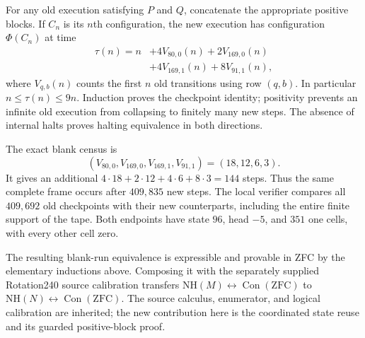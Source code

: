 For any old execution satisfying $P$ and $Q$, concatenate the
appropriate positive blocks.  If $C_n$ is its $n$th configuration,
the new execution has configuration $\Phi(C_n)$ at time
\begin{align*}
\tau(n)=n
 &+4V_{80,0}(n)+2V_{169,0}(n)\\
 &+4V_{169,1}(n)+8V_{91,1}(n),
\end{align*}
where $V_{q,b}(n)$ counts the first $n$ old transitions using row
$(q,b)$.  In particular $n\le\tau(n)\le9n$.  Induction proves the
checkpoint identity; positivity prevents an infinite old execution
from collapsing to finitely many new steps.  The absence of internal
halts proves halting equivalence in both directions.

The exact blank census is
\[
(V_{80,0},V_{169,0},V_{169,1},V_{91,1})=(18,12,6,3).
\]
It gives an additional $4\cdot18+2\cdot12+4\cdot6+8\cdot3=144$
steps.  Thus the same complete frame occurs after $409{,}835$ new
steps.  The local verifier compares all $409{,}692$ old checkpoints
with their new counterparts, including the entire finite support of
the tape.  Both endpoints have state $96$, head $-5$, and $351$ one
cells, with every other cell zero.

The resulting blank-run equivalence is expressible and provable in
ZFC by the elementary inductions above.  Composing it with the
separately supplied Rotation240 source calibration transfers
$\mathrm{NH}(M)\leftrightarrow\operatorname{Con}(\mathrm{ZFC})$ to
$\mathrm{NH}(N)\leftrightarrow\operatorname{Con}(\mathrm{ZFC})$.
The source calculus, enumerator, and logical calibration are inherited;
the new contribution here is the coordinated state reuse and its
guarded positive-block proof.

